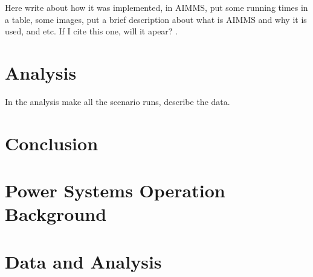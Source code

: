 \documentclass[12pt,LUDisStyle,twosided]{book}
\begin{document}
Here write about how it was implemented, in AIMMS, put some running times in a table, some images, put a brief description about what is AIMMS and why it is used, and etc. If I cite this one, will it apear? \cite{Refworks:9}.  

\chapter{Analysis}

In the analysis make all the scenario runs, describe the data.

\chapter{Conclusion}

\appendix
\chapter{Power Systems Operation Background}

\chapter{Data and Analysis}


\nocite{*}


\end{document}
